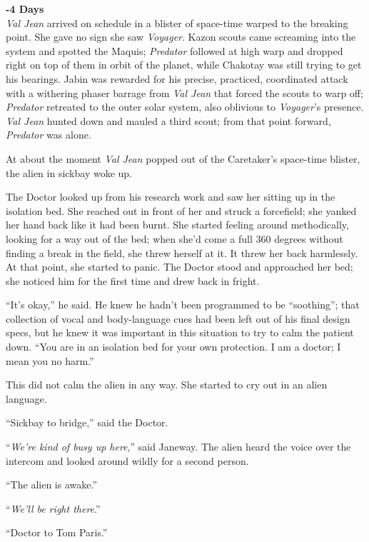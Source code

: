 \documentclass[twoside,letterpaper,12pt]{memoir}
\begin{document}
\noindent\textbf{-4 Days}\\

\textit{Val Jean} arrived on schedule in a blister of space-time warped to the breaking point. She gave no sign she saw \textit{Voyager}. Kazon scouts came screaming into the system and spotted the Maquis; \textit{Predator} followed at high warp and dropped right on top of them in orbit of the planet, while Chakotay was still trying to get his bearings. Jabin was rewarded for his precise, practiced, coordinated attack with a withering phaser barrage from \textit{Val Jean} that forced the scouts to warp off; \textit{Predator} retreated to the outer solar system, also oblivious to \textit{Voyager}'s presence. \textit{Val Jean} hunted down and mauled a third scout; from that point forward, \textit{Predator} was alone. 

At about the moment \textit{Val Jean} popped out of the Caretaker's space-time blister, the alien in sickbay woke up. 

The Doctor looked up from his research work and saw her sitting up in the isolation bed. She reached out in front of her and struck a forcefield; she yanked her hand back like it had been burnt. She started feeling around methodically, looking for a way out of the bed; when she'd come a full 360 degrees without finding a break in the field, she threw herself at it. It threw her back harmlessly. At that point, she started to panic. The Doctor stood and approached her bed; she noticed him for the first time and drew back in fright. 

``It's okay,'' he said. He knew he hadn't been programmed to be ``soothing''; that collection of vocal and body-language cues had been left out of his final design specs, but he knew it was important in this situation to try to calm the patient down. ``You are in an isolation bed for your own protection. I am a doctor; I mean you no harm.'' 

This did not calm the alien in any way. She started to cry out in an alien language. 

``Sickbay to bridge,'' said the Doctor. 

``\textit{We're kind of busy up here},'' said Janeway. The alien heard the voice over the intercom and looked around wildly for a second person. 

``The alien is awake.'' 

``\textit{We'll be right there}.'' 

``Doctor to Tom Paris.'' 
\end{document}
